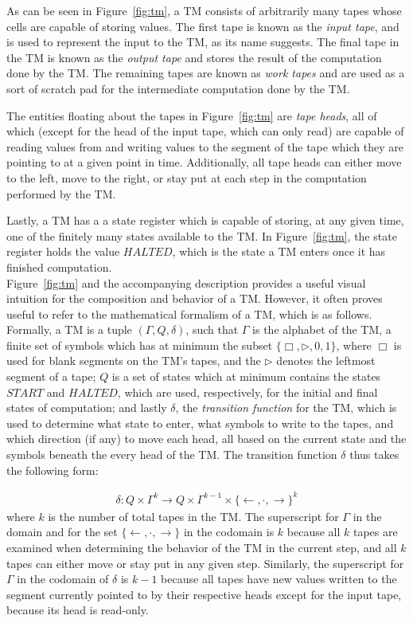 \documentclass[usletter]{article}
\begin{document}
As can be seen in Figure~\ref{fig:tm}, a TM consists of arbitrarily many tapes whose cells are capable of storing values. The first tape is known as the \emph{input tape}, and is used to represent the input to the TM, as its name suggests. The final tape in the TM is known as the \emph{output tape} and stores the result of the computation done by the TM. The remaining tapes are known as \emph{work tapes} and are used as a sort of scratch pad for the intermediate computation done by the TM.

The entities floating about the tapes in Figure~\ref{fig:tm} are \emph{tape heads}, all of which (except for the head of the input tape, which can only read) are capable of reading values from and writing values to the segment of the tape which they are pointing to at a given point in time. Additionally, all tape heads can either move to the left, move to the right, or stay put at each step in the computation performed by the TM.

Lastly, a TM has a a state register which is capable of storing, at any given time, one of the finitely many states available to the TM. In Figure~\ref{fig:tm}, the state register holds the value $HALTED$, which is the state a TM enters once it has finished computation.\\

Figure~\ref{fig:tm} and the accompanying description provides a useful visual intuition for the composition and behavior of a TM. However, it often proves useful to refer to the mathematical formalism of a TM, which is as follows. Formally, a TM is a tuple $(\Gamma, Q, \delta)$, such that $\Gamma$ is the alphabet of the TM, a finite set of symbols which has at minimum the subset $\{\Box, \rhd, 0, 1\}$, where $\Box$ is used for blank segments on the TM's tapes, and the $\rhd$ denotes the leftmost segment of a tape; $Q$ is a set of states which at minimum contains the states $START$ and $HALTED$, which are used, respectively, for the initial and final states of computation; and lastly $\delta$, the \emph{transition function} for the TM, which is used to determine what state to enter, what symbols to write to the tapes, and which direction (if any) to move each head, all based on the current state and the symbols beneath the every head of the TM. The transition function $\delta$ thus takes the following form: 

\begin{align}
\delta : Q \times \Gamma^k \rightarrow Q \times \Gamma^{k-1}\times \{\leftarrow, \cdot, \rightarrow\}^k
\end{align}
where $k$ is the number of total tapes in the TM. The superscript for $\Gamma$ in the domain and for the set $\{\leftarrow, \cdot, \rightarrow\}$ in the codomain is $k$ because all $k$ tapes are examined when determining the behavior of the TM in the current step, and all $k$ tapes can either move or stay put in any given step. Similarly, the superscript for $\Gamma$ in the codomain of $\delta$ is $k-1$ because all tapes have new values written to the segment currently pointed to by their respective heads except for the input tape, because its head is read-only.
\end{document}

